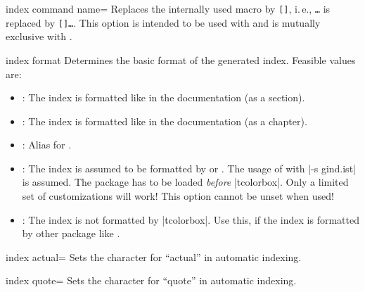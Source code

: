 \begin{docTcbKey}[][doc new=2015-01-09]{index command name}{=}{\tcbdocdescNoDefaultInit}
  Replaces the internally used  macro by
  \mbox{\texttt{[]}}, i.\,e.,
  \mbox{\texttt{\textbraceleft\ldots\textbraceright}} is replaced by
  \mbox{\texttt{[]\textbraceleft\ldots\textbraceright}}.
  This option is intended to be used with  and is
  mutually exclusive with .
\begin{dispListing}
\end{dispListing}
\end{docTcbKey}

\clearpage

\begin{docTcbKey}{index format}{%
  }{}
  Determines the basic format of the generated index.
  Feasible values are:
  \begin{itemize}
  \item{}: The index is formatted like in the  documentation (as a section).
  \item{}: The index is formatted like in the  documentation (as a chapter).
  \item{}: Alias for .
  \item{}: The index is assumed to be formatted by  or
    . The usage of 
    with |-s gind.ist| is assumed. The package  has to be loaded
    \emph{before} |tcolorbox|. Only a limited set of customizations will
    work! This option cannot be unset when used!
  \item{}: The index is not formatted by |tcolorbox|. Use this, if
    the index is formatted by other package like .
  \end{itemize}
\end{docTcbKey}


\begin{docTcbKey}{index actual}{=}{}
  Sets the character for \enquote{actual} in automatic indexing.
\end{docTcbKey}

\begin{docTcbKey}{index quote}{=}{}
  Sets the character for \enquote{quote} in automatic indexing.
\end{docTcbKey}

